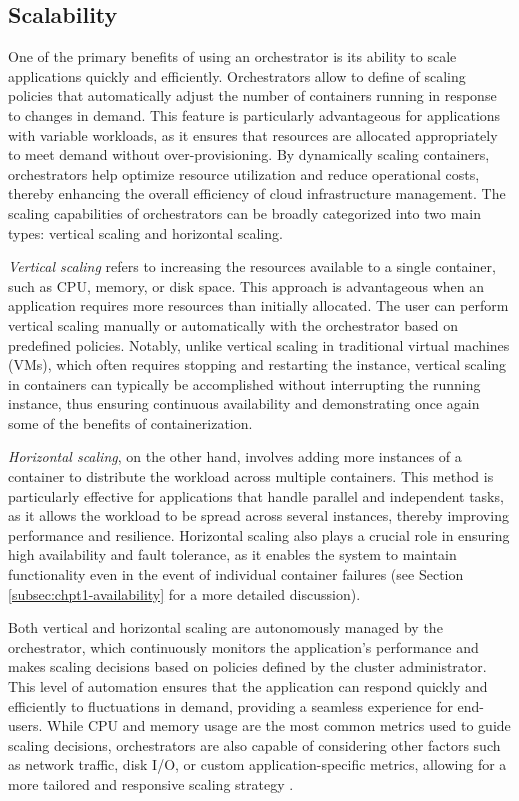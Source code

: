 \subsection{Scalability}

One of the primary benefits of using an orchestrator is its ability to scale
applications quickly and efficiently.
Orchestrators allow to define of scaling policies that automatically adjust the
number of containers running in response to changes in demand.
This feature is particularly advantageous for applications with variable
workloads, as it ensures that resources are allocated appropriately to meet
demand without over-provisioning.
By dynamically scaling containers, orchestrators help optimize resource
utilization and reduce operational costs, thereby enhancing the overall
efficiency of cloud infrastructure management.
The scaling capabilities of orchestrators can be broadly categorized into two
main types: vertical scaling and horizontal scaling.

\textit{Vertical scaling} refers to increasing the resources available to a single
container, such as CPU, memory, or disk space.
This approach is advantageous when an application requires more resources than
initially allocated.
The user can perform vertical scaling manually or automatically with the
orchestrator based on predefined policies.
Notably, unlike vertical scaling in traditional virtual machines (VMs), which
often requires stopping and restarting the instance, vertical scaling in
containers can typically be accomplished without interrupting the running
instance, thus ensuring continuous availability and demonstrating once again
some of the benefits of containerization.

\textit{Horizontal scaling}, on the other hand, involves adding more instances of a
container to distribute the workload across multiple containers.
This method is particularly effective for applications that handle parallel and
independent tasks, as it allows the workload to be spread across several
instances, thereby improving performance and resilience.
Horizontal scaling also plays a crucial role in ensuring high availability and
fault tolerance, as it enables the system to maintain functionality even in the
event of individual container failures (see Section
\ref{subsec:chpt1-availability} for a more detailed discussion).

Both vertical and horizontal scaling are autonomously managed by the
orchestrator, which continuously monitors the application's performance and
makes scaling decisions based on policies defined by the cluster administrator.
This level of automation ensures that the application can respond quickly and
efficiently to fluctuations in demand, providing a seamless experience for
end-users.
While CPU and memory usage are the most common metrics used to guide scaling
decisions, orchestrators are also capable of considering other factors such as
network traffic, disk I/O, or custom application-specific metrics, allowing for
a more tailored and responsive scaling strategy \cite{Qu2016}.

